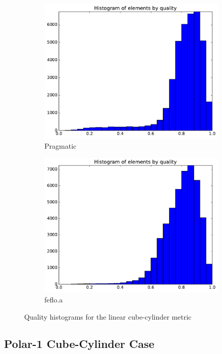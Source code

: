 \documentclass[3p,times,procedia,number]{elsarticle}
\begin{document}
\begin{figure}
\begin{subfigure}{.16\textwidth}
\includegraphics[width=\textwidth]{pragmatic-cube-cylinder-linear-quality.pdf}
\caption{Pragmatic}
\end{subfigure}
\begin{subfigure}{.16\textwidth}
\centering
\includegraphics[width=\textwidth]{fefloa-cube-cylinder-linear-quality.pdf}
\caption{feflo.a}
\end{subfigure}
\caption{Quality histograms for the linear cube-cylinder metric}
\label{fig:cube-cylinder-linear-qualities}
\end{figure}

\subsection{Polar-1 Cube-Cylinder Case}
\label{sec:cube-cylinder-polar-1}
\end{document}
